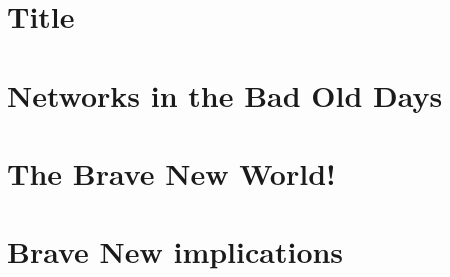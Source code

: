 \documentclass[12pt,letterpaper]{article}
\author{Christopher C. Lamb}
\begin{document}
\section{Title}

\section{Networks in the Bad Old Days}

\section{The Brave New World!}

\section{Brave New implications}

\newpage
\end{document}
